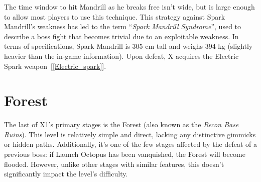  The time window to hit Mandrill as he breaks free isn't wide, but is large enough to allow most players to use this technique.  This strategy against Spark Mandrill's weakness has led to the term ``\textit{Spark Mandrill Syndrome}'', used to describe a boss fight that becomes trivial due to an exploitable weakness. In terms of specifications, Spark Mandrill is 305 cm tall and weighs 394 kg (slightly heavier than the in-game information). Upon defeat, X acquires the Electric Spark weapon~[\ref{Electric_spark}].

\section{Forest}

The last of X1's primary stages is the Forest (also known as the \textit{Recon Base Ruins}). This level is relatively simple and direct, lacking any distinctive gimmicks or hidden paths. Additionally, it's one of the few stages affected by the defeat of a previous boss: if Launch Octopus has been vanquished, the Forest will become flooded. However, unlike other stages with similar features, this doesn't significantly impact the level's difficulty.

